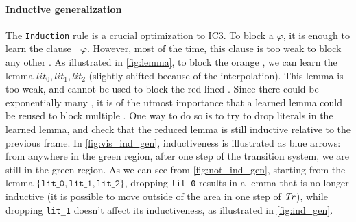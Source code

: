 \paragraph{Inductive generalization}
The \texttt{Induction} rule is a crucial optimization to IC3. To block a \pob
$\varphi$, it is enough to learn the clause $\lnot \varphi$. However, most of the
time, this clause is too weak to block any other \pob. As illustrated in
\cref{fig:lemma}, to block the orange \pob, we can learn the lemma
${lit_0, lit_1, lit_2}$ (slightly shifted because of the interpolation). This
lemma is too weak, and cannot be used to block the red-lined \pob. Since there
could be exponentially many \pobs, it is of the utmost importance that a learned
lemma could be reused to block multiple \pobs. One way to do so is to try to
drop literals in the learned lemma, and check that the reduced lemma is still
inductive relative to the previous frame. In \cref{fig:vis_ind_gen},
inductiveness is illustrated as blue arrows: from anywhere in the green
region, after one step of the transition system, we are still in the green
region.
As we can see from \cref{fig:not_ind_gen}, starting from the lemma $\{\texttt{lit\_0},
\texttt{lit\_1}, \texttt{lit\_2}\}$, dropping \texttt{lit\_0} results in a lemma
that is no longer inductive (it is possible to move outside of the area in one
step of $\mathit{Tr}$), while dropping \texttt{lit\_1} doesn't affect its inductiveness, as illustrated in \cref{fig:ind_gen}.

